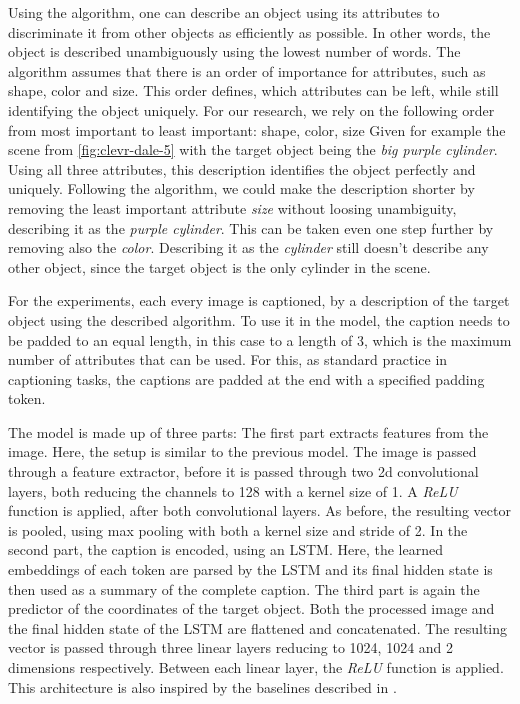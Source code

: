 Using the algorithm, one can describe an object using its attributes to discriminate it from other objects as efficiently as possible.
In other words, the object is described unambiguously using the lowest number of words.
The algorithm assumes that there is an order of importance for attributes, such as shape, color and size.
This order defines, which attributes can be left, while still identifying the object uniquely.
For our research, we rely on the following order from most important to least important: shape, color, size
Given for example the scene from \ref{fig:clevr-dale-5} with the target object being the \emph{big purple cylinder}.
Using all three attributes, this description identifies the object perfectly and uniquely.
Following the algorithm, we could make the description shorter by removing the least important attribute \emph{size} without loosing unambiguity, describing it as the \emph{purple cylinder}.
This can be taken even one step further by removing also the \emph{color}.
Describing it as the \emph{cylinder} still doesn't describe any other object, since the target object is the only cylinder in the scene.

For the experiments, each every image is captioned, by a description of the target object using the described algorithm.
To use it in the model, the caption needs to be padded to an equal length, in this case to a length of 3, which is the maximum number of attributes that can be used.
For this, as standard practice in captioning tasks, the captions are padded at the end with a specified padding token.

The model is made up of three parts:
The first part extracts features from the image.
Here, the setup is similar to the previous model.
The image is passed through a feature extractor, before it is passed through two 2d convolutional layers, both reducing the channels to 128 with a kernel size of 1.
A \emph{ReLU} function is applied, after both convolutional layers.
As before, the resulting vector is pooled, using max pooling with both a kernel size and stride of 2.
In the second part, the caption is encoded, using an LSTM.
Here, the learned embeddings of each token are parsed by the LSTM and its final hidden state is then used as a summary of the complete caption.
The third part is again the predictor of the coordinates of the target object.
Both the processed image and the final hidden state of the LSTM are flattened and concatenated.
The resulting vector is passed through three linear layers reducing to 1024, 1024 and 2 dimensions respectively.
Between each linear layer, the \emph{ReLU} function is applied.
This architecture is also inspired by the baselines described in \citet{Johnson2017}.

